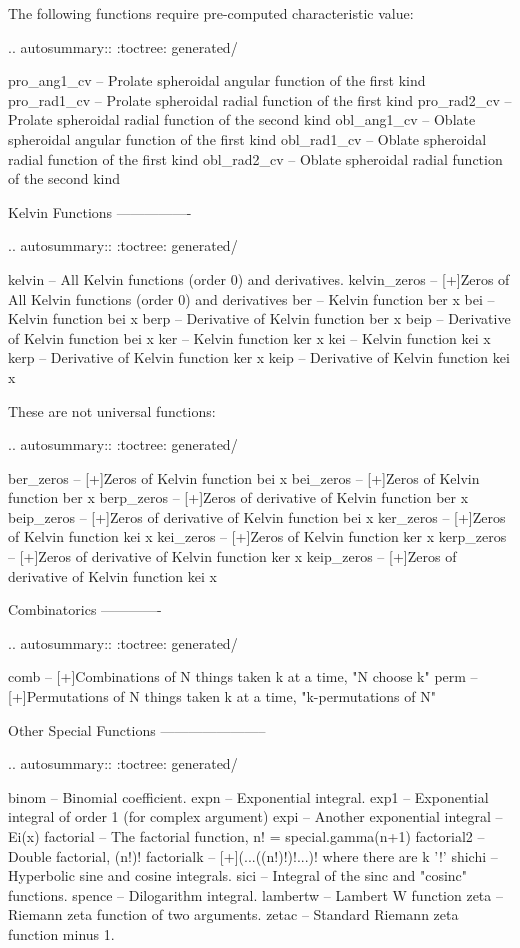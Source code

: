 \begin{DoxyVerb}
The following functions require pre-computed characteristic value:

.. autosummary::
   :toctree: generated/

   pro_ang1_cv -- Prolate spheroidal angular function of the first kind
   pro_rad1_cv -- Prolate spheroidal radial function of the first kind
   pro_rad2_cv -- Prolate spheroidal radial function of the second kind
   obl_ang1_cv -- Oblate spheroidal angular function of the first kind
   obl_rad1_cv -- Oblate spheroidal radial function of the first kind
   obl_rad2_cv -- Oblate spheroidal radial function of the second kind

Kelvin Functions
----------------

.. autosummary::
   :toctree: generated/

   kelvin       -- All Kelvin functions (order 0) and derivatives.
   kelvin_zeros -- [+]Zeros of All Kelvin functions (order 0) and derivatives
   ber          -- Kelvin function ber x
   bei          -- Kelvin function bei x
   berp         -- Derivative of Kelvin function ber x
   beip         -- Derivative of Kelvin function bei x
   ker          -- Kelvin function ker x
   kei          -- Kelvin function kei x
   kerp         -- Derivative of Kelvin function ker x
   keip         -- Derivative of Kelvin function kei x

These are not universal functions:

.. autosummary::
   :toctree: generated/

   ber_zeros    -- [+]Zeros of Kelvin function bei x
   bei_zeros    -- [+]Zeros of Kelvin function ber x
   berp_zeros   -- [+]Zeros of derivative of Kelvin function ber x
   beip_zeros   -- [+]Zeros of derivative of Kelvin function bei x
   ker_zeros    -- [+]Zeros of Kelvin function kei x
   kei_zeros    -- [+]Zeros of Kelvin function ker x
   kerp_zeros   -- [+]Zeros of derivative of Kelvin function ker x
   keip_zeros   -- [+]Zeros of derivative of Kelvin function kei x

Combinatorics
-------------

.. autosummary::
    :toctree: generated/

    comb    -- [+]Combinations of N things taken k at a time, "N choose k"
    perm    -- [+]Permutations of N things taken k at a time, "k-permutations of N"

Other Special Functions
-----------------------

.. autosummary::
   :toctree: generated/

   binom        -- Binomial coefficient.
   expn         -- Exponential integral.
   exp1         -- Exponential integral of order 1 (for complex argument)
   expi         -- Another exponential integral -- Ei(x)
   factorial    -- The factorial function, n! = special.gamma(n+1)
   factorial2   -- Double factorial, (n!)!
   factorialk   -- [+](...((n!)!)!...)! where there are k '!'
   shichi       -- Hyperbolic sine and cosine integrals.
   sici         -- Integral of the sinc and "cosinc" functions.
   spence       -- Dilogarithm integral.
   lambertw     -- Lambert W function
   zeta         -- Riemann zeta function of two arguments.
   zetac        -- Standard Riemann zeta function minus 1.


\end{DoxyVerb}
